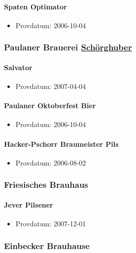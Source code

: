\documentclass[11pt]{article}
\begin{document}
\paragraph{Spaten Optimator}
\label{sec:orge86a2b9}
\begin{itemize}
\item Provdatum: 2006-10-04
\end{itemize}
\subsubsection{Paulaner Brauerei \underline{Schörghuber}}
\label{sec:orgf214765}
\paragraph{Salvator}
\label{sec:orgec310cb}
\begin{itemize}
\item Provdatum: 2007-04-04
\end{itemize}
\paragraph{Paulaner Oktoberfest Bier}
\label{sec:orgc924f43}
\begin{itemize}
\item Provdatum: 2006-10-04
\end{itemize}
\paragraph{Hacker-Pschorr Braumeister Pils}
\label{sec:org31d1a2c}
\begin{itemize}
\item Provdatum: 2006-08-02
\end{itemize}
\subsubsection{Friesisches Brauhaus}
\label{sec:orgdae23bd}
\paragraph{Jever Pilsener}
\label{sec:org267416b}
\begin{itemize}
\item Provdatum: 2007-12-01
\end{itemize}
\subsubsection{Einbecker Brauhause}
\label{sec:org2235ec1}
\end{document}
